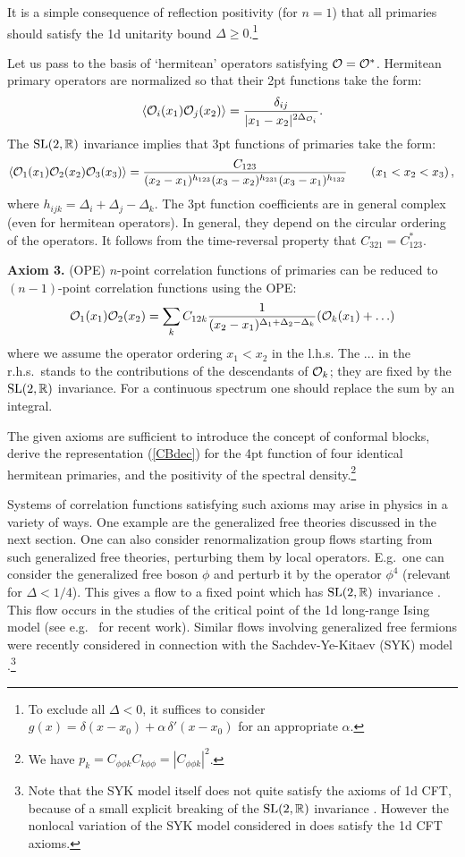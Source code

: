 \documentclass[12pt]{article}
\newcommand{\reef}[1]{(\ref{#1})}
\newcommand{\beq}{\begin{equation}}
\newcommand{\eeq}{\end{equation}}
\def\bR {\mathbb{R}}
\def\calO {{\cal O}}
\def\ge{\geqslant}
\newcommand{\D}{\Delta}
\numberwithin{equation}{section}
\begin{document}
It is a simple consequence of reflection positivity (for $n=1$) that all primaries should satisfy the 1d unitarity bound $\Delta\ge 0$.\footnote{To exclude all $\Delta<0$, it suffices to consider $g(x)=\delta(x-x_0)+\alpha\, \delta'(x-x_0)$ for an appropriate $\alpha$.}

Let us pass to the basis of `hermitean' operators satisfying $\calO=\calO^*$. Hermitean primary operators are normalized so that their 2pt functions take the form:
\beq
\langle \calO_i(x_1)\calO_j(x_2) \rangle = \frac{\delta_{ij}}{|x_1-x_2|^{2\Delta_{\calO_i}}}.
\eeq
The ${\rm SL}(2,\bR)$ invariance implies that 3pt functions of primaries take the form:
\beq
\langle \calO_1(x_1)\calO_2(x_2) \calO_3(x_3)\rangle = \frac{C_{123}}{(x_2-x_1)^{h_{123}}(x_3-x_2)^{h_{231}}(x_3-x_1)^{h_{132}}}\qquad (x_1<x_2<x_3)\,,\\
\eeq
where $h_{ijk}=\D_i+\D_j-\D_k$. The 3pt function coefficients are in general complex (even for hermitean operators). In general, they depend on the circular ordering of the operators. It follows from the time-reversal property that $C_{321}=C_{123}^*$.


{\bf Axiom 3.} (OPE) $n$-point correlation functions of primaries can be reduced to $(n-1)$-point correlation functions using the OPE:
\beq
\calO_1(x_1) \calO_2(x_2) = \sum_k C_{12k} \frac{1}{(x_2-x_1)^{\Delta_1+\Delta_2-\Delta_k}}(\calO_k(x_1)+\ldots)
\eeq
where we assume the operator ordering $x_1<x_2$ in the l.h.s. The $\ldots$ in the r.h.s.~stands to the contributions of the descendants of $\calO_k$; they are fixed by the ${\rm SL}(2,\bR)$ invariance. For a continuous spectrum one should replace the sum by an integral.

The given axioms are sufficient to introduce the concept of conformal blocks, derive the representation \reef{CBdec} for the 4pt function of four identical hermitean primaries, and the positivity of the spectral density.\footnote{We have $p_k=C_{\phi\phi k}C_{k\phi\phi}=|C_{\phi\phi k}|^2$.}

Systems of correlation functions satisfying such axioms may arise in physics in a variety of ways.
One example are the generalized free theories discussed in the next section. One can also consider renormalization group flows starting from such generalized free theories, perturbing them by local operators. E.g.~one can consider the generalized free boson $\phi$ and perturb it by the operator $\phi^4$ (relevant for $\Delta<1/4$). This gives a flow to a fixed point which has ${\rm SL}(2,\bR)$ invariance \cite{Paulos:2015jfa}. This flow occurs in the studies of the critical point of the 1d long-range Ising model \cite{Fisher:1972zz} (see e.g.~\cite{Behan:2017dwr,Behan:2017emf} for recent work). Similar flows involving generalized free fermions were recently considered in connection with the Sachdev-Ye-Kitaev (SYK) model \cite{Gross:2017vhb}.\footnote{Note that the SYK model itself does not quite satisfy the axioms of 1d CFT, because of a small explicit breaking of the ${\rm SL}(2,\bR)$ invariance \cite{Maldacena:2016hyu}. However the nonlocal variation of the SYK model considered in \cite{Gross:2017vhb} does satisfy the 1d CFT axioms.}
\end{document}
